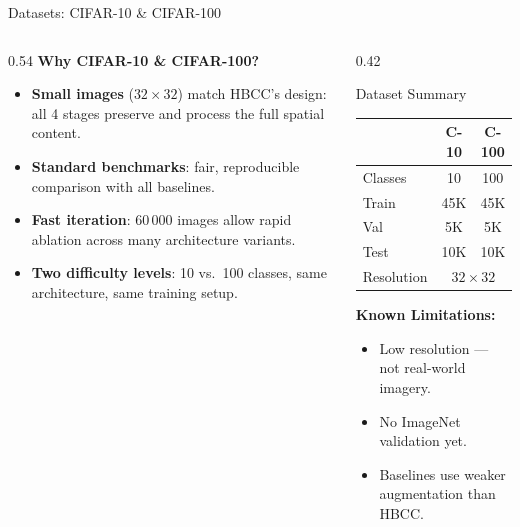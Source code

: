 \documentclass{beamer}
\begin{document}
\begin{frame}{Datasets: CIFAR-10 \& CIFAR-100}
  \begin{columns}[T]
    \begin{column}{0.54\textwidth}
      \textbf{Why CIFAR-10 \& CIFAR-100?}
      \begin{itemize}\setlength\itemsep{6pt}
        \item \textbf{Small images} ($32\!\times\!32$) match HBCC's design:
              all 4 stages preserve and process the full spatial content.
        \item \textbf{Standard benchmarks}: fair, reproducible comparison
              with all baselines.
        \item \textbf{Fast iteration}: 60\,000 images allow rapid
              ablation across many architecture variants.
        \item \textbf{Two difficulty levels}: 10 vs.\ 100 classes,
              same architecture, same training setup.
      \end{itemize}
    \end{column}
    \begin{column}{0.42\textwidth}
      \begin{block}{Dataset Summary}
        \centering
        \begin{tabular}{lcc}
          \toprule
                     & \textbf{C-10} & \textbf{C-100} \\
          \midrule
          Classes    & 10   & 100  \\
          Train      & 45K  & 45K  \\
          Val        & 5K   & 5K   \\
          Test       & 10K  & 10K  \\
          Resolution & \multicolumn{2}{c}{$32\!\times\!32$} \\
          \bottomrule
        \end{tabular}
      \end{block}

      \vspace{0.4em}
      \textbf{Known Limitations:}
      \begin{itemize}\small\setlength\itemsep{4pt}
        \item Low resolution --- not real-world imagery.
        \item No ImageNet validation yet.
        \item Baselines use weaker augmentation than HBCC.
      \end{itemize}
    \end{column}
  \end{columns}
\end{frame}
\end{document}
